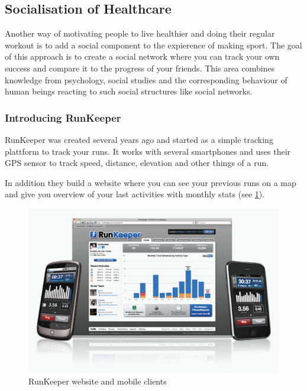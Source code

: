 \documentclass[a4paper,11pt]{article}
\begin{document}
\pagebreak

\subsection{Socialisation of Healthcare}
\label{sect:star:social}
Another way of motivating people to live healthier and doing their regular workout is to add a social component to the expierence of making sport. The goal of this approach is to create a social network where you can track your own success and compare it to the progress of your friends. This area combines knowledge from psychology, social studies and the corresponding behaviour of human beings reacting to such social structures like social networks.

\subsubsection{Introducing RunKeeper}
\label{sect:star:runkeeper}
RunKeeper was created several years ago and started as a simple tracking plattform to track your runs. It works with several smartphones and uses their GPS sensor to track speed, distance, elevation and other things of a run.

In addition they build a website where you can see your previous runs on a map and give you overview of your last activities with monthly stats (see \ref{fig:runkeeper}).

\begin{figure}[ht]
\begin{center}
\includegraphics[width=12cm]{images/stateoftheart/runkeeper.jpg}
\caption{RunKeeper website and mobile clients}
\label{fig:runkeeper}
\end{center}
\end{figure}
\end{document}
